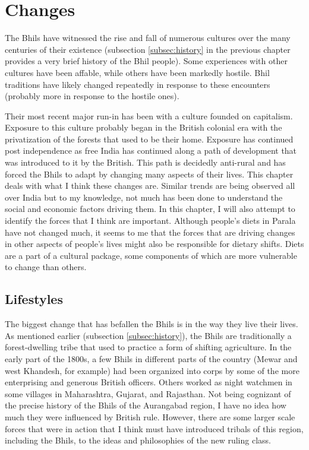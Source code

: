 \documentclass[report.tex]{subfiles}
\begin{document}
\chapter{Changes}

The Bhils have witnessed the rise and fall of numerous cultures over the many centuries of their existence (subsection \ref{subsec:history} in the previous chapter provides a very brief history of the Bhil people). Some experiences with other cultures have been affable, while others have been markedly hostile. Bhil traditions have likely changed repeatedly in response to these encounters (probably more in response to the hostile ones).

Their most recent major run-in has been with a culture founded on capitalism. Exposure to this culture probably began in the British colonial era with the privatization of the forests that used to be their home. Exposure has continued post independence as free India has continued along a path of development that was introduced to it by the British. This path is decidedly anti-rural and has forced the Bhils to adapt by changing many aspects of their lives. This chapter deals with what I think these changes are. Similar trends are being observed all over India but to my knowledge, not much has been done to understand the social and economic factors driving them. In this chapter, I will also attempt to identify the forces that I think are important. Although people's diets in Parala have not changed much, it seems to me that the forces that are driving changes in other aspects of people's lives might also be responsible for dietary shifts. Diets are a part of a cultural package, some components of which are more vulnerable to change than others.

\section{Lifestyles}\label{sec:lifestyles}

The biggest change that has befallen the Bhils is in the way they live their lives. As mentioned earlier (subsection \ref{subsec:history}), the Bhils are traditionally a forest-dwelling tribe that used to practice a form of shifting agriculture. In the early part of the 1800s, a few Bhils in different parts of the country (Mewar and west Khandesh, for example) had been organized into corps by some of the more enterprising and generous British officers. Others worked as night watchmen in some villages in Maharashtra, Gujarat, and Rajasthan. Not being cognizant of the precise history of the Bhils of the Aurangabad region, I have no idea how much they were influenced by British rule. However, there are some larger scale forces that were in action that I think must have introduced tribals of this region, including the Bhils, to the ideas and philosophies of the new ruling class.
\end{document}
